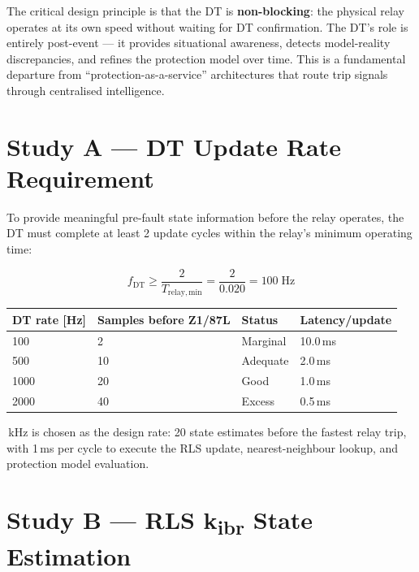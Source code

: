 \documentclass[11pt,a4paper]{article}
\begin{document}
\noindent
The critical design principle is that the DT is \textbf{non-blocking}: the
physical relay operates at its own speed without waiting for DT confirmation.
The DT's role is entirely post-event --- it provides situational awareness,
detects model-reality discrepancies, and refines the protection model over time.
This is a fundamental departure from ``protection-as-a-service'' architectures
that route trip signals through centralised intelligence.

\section{Study A --- DT Update Rate Requirement}
\label{sec:studyA}

To provide meaningful pre-fault state information before the relay operates,
the DT must complete at least 2 update cycles within the relay's minimum
operating time:

\begin{equation}
  f_\mathrm{DT} \geq \frac{2}{T_\mathrm{relay,min}} = \frac{2}{0.020} = 100\;\mathrm{Hz}
\end{equation}

\begin{center}
\begin{tabular}{@{}llll@{}}
\toprule
DT rate [Hz] & Samples before Z1/87L & Status & Latency/update \\
\midrule
100  & 2   & Marginal & 10.0\,ms \\
500  & 10  & Adequate & 2.0\,ms \\
1000 & 20  & Good     & 1.0\,ms \\
2000 & 40  & Excess   & 0.5\,ms \\
\bottomrule
\end{tabular}
\end{center}

\medskip{}\,kHz is chosen as the design rate: 20 state estimates before the fastest
relay trip, with 1\,ms per cycle to execute the RLS update, nearest-neighbour
lookup, and protection model evaluation.

\section{Study B --- RLS k\textsubscript{ibr} State Estimation}
\label{sec:studyB}
\end{document}

